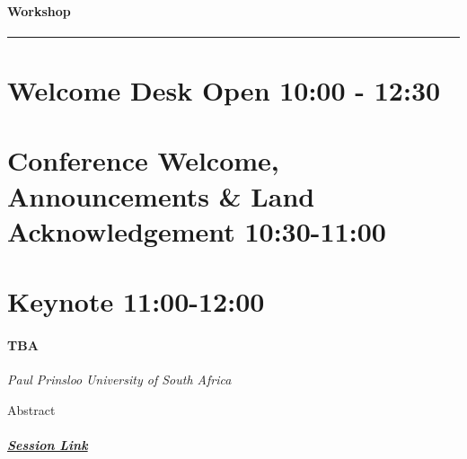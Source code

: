 \documentclass[
]{book}
\begin{document}
\begin{workshop}
\hypertarget{workshop}{%
\paragraph{Workshop}\label{workshop}}
\end{workshop}

\begin{center}\rule{0.5\linewidth}{0.5pt}\end{center}

\hypertarget{welcome-desk-open-1000---1230}{%
\section*{Welcome Desk Open \textbar{} 10:00 - 12:30}\label{welcome-desk-open-1000---1230}}

\hypertarget{conference-welcome-announcements-land-acknowledgement-1030-1100}{%
\section*{Conference Welcome, Announcements \& Land Acknowledgement \textbar{} 10:30-11:00}\label{conference-welcome-announcements-land-acknowledgement-1030-1100}}

\hypertarget{keynote-1100-1200-2}{%
\section*{Keynote \textbar{} 11:00-12:00}\label{keynote-1100-1200-2}}

\begin{keynote}
\hypertarget{tba}{%
\paragraph*{TBA}\label{tba}}

\emph{Paul Prinsloo} \emph{University of South Africa}

Abstract

\hypertarget{session-link}{%
\subparagraph*{\texorpdfstring{\href{}{Session
Link}}{Session Link}}\label{session-link}}
\end{keynote}
\end{document}
